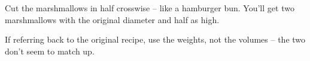 \begin{recipe}
	\suggestion
	{
		Cut the marshmallows in half crosswise -- like a hamburger bun. You'll get two marshmallows with the original diameter and half as high. 
	}
	
	
	\hint
	{
		If referring back to the original recipe, use the weights, not the volumes -- the two don't seem to match up. 
	}

\end{recipe}
